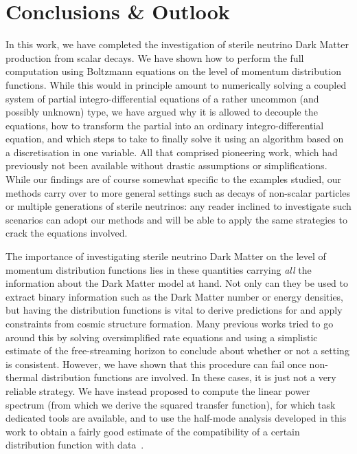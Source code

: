 \section{\label{sec:CandO}Conclusions \& Outlook}

In this work, we have completed the investigation of sterile neutrino Dark Matter production from scalar decays. We have shown how to perform the full computation using Boltzmann equations on the level of momentum distribution functions. While this would in principle amount to numerically solving a coupled system of partial integro-differential equations of a rather uncommon (and possibly unknown) type, we have argued why it is allowed to decouple the equations, how to transform the partial into an ordinary integro-differential equation, and which steps to take to finally solve it using an algorithm based on a discretisation in one variable. All that comprised pioneering work, which had previously not been available without drastic assumptions or simplifications. While our findings are of course somewhat specific to the examples studied, our methods carry over to more general settings such as decays of non-scalar particles or multiple generations of sterile neutrinos: any reader inclined to investigate such scenarios can adopt our methods and will be able to apply the same strategies to crack the equations involved.

The importance of investigating sterile neutrino Dark Matter on the level of momentum distribution functions lies in these quantities carrying \emph{all} the information about the Dark Matter model at hand. Not only can they be used to extract binary information such as the Dark Matter number or energy densities, but having the distribution functions is vital to derive predictions for and apply constraints from cosmic structure formation. Many previous works tried to go around this by solving oversimplified rate equations and using a simplistic estimate of the free-streaming horizon to conclude about whether or not a setting is consistent. However, we have shown that this procedure can fail once non-thermal distribution functions are involved. In these cases, it is just not a very reliable strategy. We have instead proposed to compute the linear power spectrum (from which we derive the squared transfer function), for which task dedicated tools are available, and to use the half-mode analysis developed in this work to obtain a fairly good estimate of the compatibility of a certain distribution function with data~\cite{MenciSchneiderViel}.

